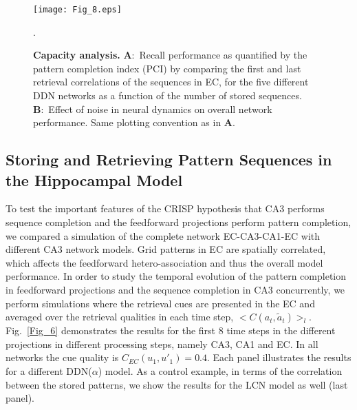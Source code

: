 \documentclass[utf8]{frontiersSCNS} %
\begin{document}
\begin{figure}[!htb]
\centering\texttt{[image: Fig\_8.eps]}
\caption{\textbf{Capacity analysis.} 
\textbf{A}:~Recall performance as quantified by the pattern completion index (PCI) by comparing the first and last retrieval correlations of the sequences in EC, for the five different DDN networks as a function of the number of stored sequences. 
\textbf{B}:~Effect of noise in neural dynamics on overall network performance.
Same plotting convention as in \textbf{A}.
}.   
\label{Fig_8}
\end{figure}


\subsection{Storing and Retrieving Pattern Sequences in the Hippocampal Model}




To test the important features of the CRISP hypothesis that CA3 performs sequence completion and the feedforward projections perform pattern completion, we compared a simulation of the complete network EC-CA3-CA1-EC with different CA3 network models.
%
Grid patterns in EC are spatially correlated, which affects the feedforward hetero-association and thus the overall model performance. 
%
In order to study the temporal evolution of the pattern completion in feedforward projections and the sequence completion in CA3 concurrently,  we perform simulations where the retrieval cues are presented in the EC and averaged over the retrieval qualities in each time step, $<C(a_t, \tilde{a}_t)>_l$.
%
Fig.~\ref{Fig_6} demonstrates the results for the first 8 time steps in the different projections in different processing steps, namely CA3, CA1 and EC. In all networks the cue quality is $C_{EC}(u_1, u'_1) = 0.4$.
%
Each panel illustrates the results for a different DDN($\alpha$) model. As a control example, in terms of the correlation between the stored patterns, we show the results for the LCN model as well (last panel). 
%
\end{document}
